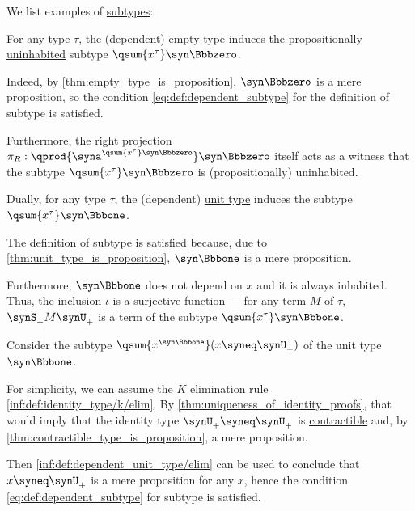 \begin{example}\label{ex:def:dependent_subtype}
  We list examples of \hyperref[def:dependent_subtype]{subtypes}:
  \begin{thmenum}
     For any type \( \tau \), the (dependent) \hyperref[def:dependent_empty_type]{empty type} induces the \hyperref[def:propositionally_uninhabited]{propositionally uninhabited} subtype \( \qsum {x^\tau} \syn\Bbbzero \).

    Indeed, by \cref{thm:empty_type_is_proposition}, \( \syn\Bbbzero \) is a mere proposition, so the condition \eqref{eq:def:dependent_subtype} for the definition of subtype is satisfied.

    Furthermore, the right projection \( \pi_R: \qprod {\syna^{\qsum {x^\tau} \syn\Bbbzero}} \syn\Bbbzero \) itself acts as a witness that the subtype \( \qsum {x^\tau} \syn\Bbbzero \) is (propositionally) uninhabited.

     Dually, for any type \( \tau \), the (dependent) \hyperref[def:dependent_unit_type]{unit type} induces the subtype \( \qsum {x^\tau} \syn\Bbbone \).

    The definition of subtype is satisfied because, due to \cref{thm:unit_type_is_proposition}, \( \syn\Bbbone \) is a mere proposition.

    Furthermore, \( \syn\Bbbone \) does not depend on \( x \) and it is always inhabited. Thus, the inclusion \( \iota \) is a surjective function --- for any term \( M \) of \( \tau \), \( \synS_+ M \synU_+ \) is a term of the subtype \( \qsum {x^\tau} \syn\Bbbone \).

     Consider the subtype \( \qsum {x^{\syn\Bbbone}} (x \syneq \synU_+) \) of the unit type \( \syn\Bbbone \).

    For simplicity, we can assume the \( K \) elimination rule \ref{inf:def:identity_type/k/elim}. By \cref{thm:uniqueness_of_identity_proofs}, that would imply that the identity type \( \synU_+ \syneq \synU_+ \) is \hyperref[def:contractible_type]{contractible} and, by \cref{thm:contractible_type_is_proposition}, a mere proposition.

    Then \ref{inf:def:dependent_unit_type/elim} can be used to conclude that \( x \syneq \synU_+ \) is a mere proposition for any \( x \), hence the condition \eqref{eq:def:dependent_subtype} for subtype is satisfied.
  \end{thmenum}
\end{example}

